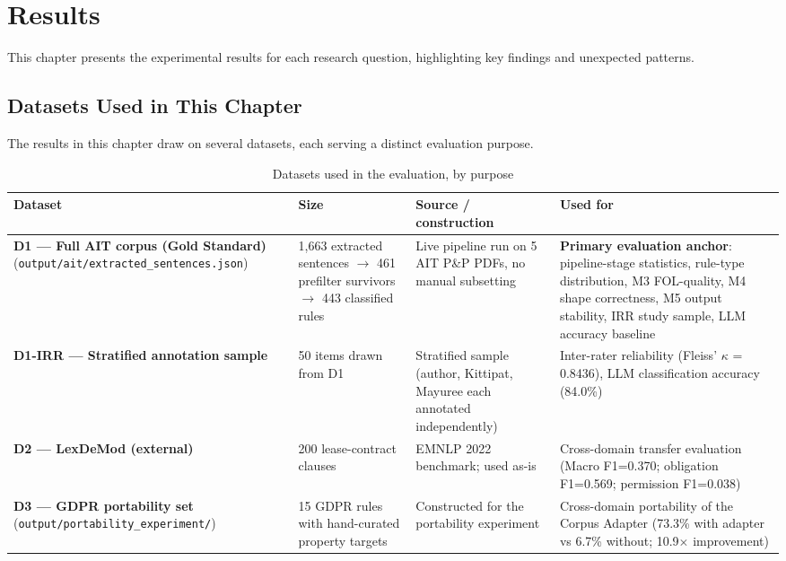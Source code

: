 \chapter{Results}
\label{ch:results}

This chapter presents the experimental results for each research question, highlighting key findings and unexpected patterns.

\section{Datasets Used in This Chapter}
\label{sec:datasets}

The results in this chapter draw on several datasets, each serving a distinct evaluation purpose.

\begin{table}[htbp]
\centering
\caption{Datasets used in the evaluation, by purpose}
\label{tab:datasets-used}
\small
\begin{tabular}{p{3.5cm}p{2cm}p{4cm}p{4cm}}
\toprule
\textbf{Dataset} & \textbf{Size} & \textbf{Source / construction} & \textbf{Used for} \\
\midrule
\textbf{D1 — Full AIT corpus (Gold Standard)} (\texttt{output/ait/extracted\_sentences.json}) & 1,663 extracted sentences $\rightarrow$ 461 prefilter survivors $\rightarrow$ 443 classified rules & Live pipeline run on 5 AIT P\&P PDFs, no manual subsetting & \textbf{Primary evaluation anchor}: pipeline-stage statistics, rule-type distribution, M3 FOL-quality, M4 shape correctness, M5 output stability, IRR study sample, LLM accuracy baseline \\
\midrule
\textbf{D1-IRR — Stratified annotation sample} & 50 items drawn from D1 & Stratified sample (author, Kittipat, Mayuree each annotated independently) & Inter-rater reliability (Fleiss' $\kappa$ = 0.8436), LLM classification accuracy (84.0\%) \\
\midrule
\textbf{D2 — LexDeMod (external)} & 200 lease-contract clauses & EMNLP 2022 benchmark; used as-is & Cross-domain transfer evaluation (Macro F1=0.370; obligation F1=0.569; permission F1=0.038) \\
\midrule
\textbf{D3 — GDPR portability set} (\texttt{output/portability\_experiment/}) & 15 GDPR rules with hand-curated property targets & Constructed for the portability experiment & Cross-domain portability of the Corpus Adapter (73.3\% with adapter vs 6.7\% without; 10.9$\times$ improvement) \\
\bottomrule
\end{tabular}
\end{table}

